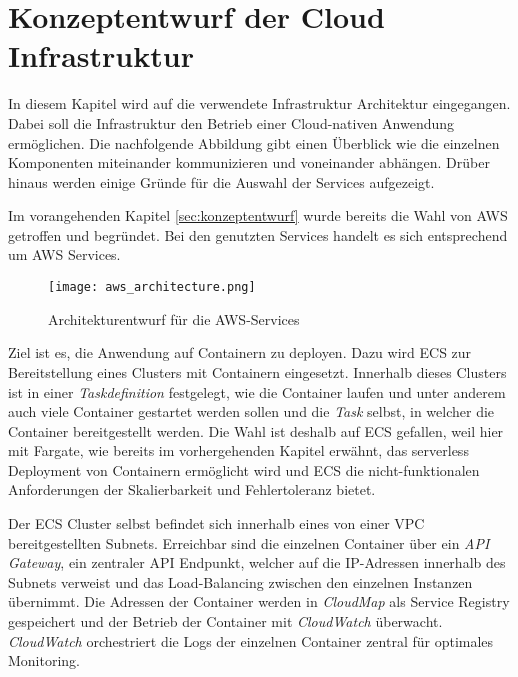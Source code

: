 \section{Konzeptentwurf der Cloud Infrastruktur}
\label{sec:cloud-infra}
In diesem Kapitel wird auf die verwendete Infrastruktur Architektur eingegangen. %
Dabei soll die Infrastruktur den Betrieb einer Cloud-nativen Anwendung ermöglichen. Die nachfolgende Abbildung gibt einen Überblick wie die einzelnen Komponenten miteinander kommunizieren und voneinander abhängen. Drüber hinaus werden einige Gründe für die Auswahl der Services aufgezeigt.

Im vorangehenden Kapitel \ref{sec:konzeptentwurf} wurde bereits die Wahl von \ac{AWS} getroffen und begründet. Bei den genutzten Services handelt es sich entsprechend um \ac{AWS} Services.

\begin{figure}[H]
    \centering
    \texttt{[image: aws\_architecture.png]}
    \caption{Architekturentwurf für die AWS-Services}
    \label{fig:CloudArchitektur}
\end{figure}

Ziel ist es, die Anwendung auf Containern zu deployen. Dazu wird \ac{ECS} zur Bereitstellung eines Clusters mit Containern eingesetzt. Innerhalb dieses Clusters ist in einer \textit{Taskdefinition} festgelegt, wie die Container laufen und unter anderem auch viele Container gestartet werden sollen und die \textit{Task} selbst, in welcher die Container bereitgestellt werden. Die Wahl ist deshalb auf \ac{ECS} gefallen, weil hier mit \gls{Fargate}, wie bereits im vorhergehenden Kapitel erwähnt, das serverless Deployment von Containern ermöglicht wird und \ac{ECS} die nicht-funktionalen Anforderungen der Skalierbarkeit und Fehlertoleranz bietet. \pagebreak

Der \ac{ECS} Cluster selbst befindet sich innerhalb eines von einer \ac{VPC} bereitgestellten Subnets. Erreichbar sind die einzelnen Container über ein \textit{API Gateway}, ein zentraler API Endpunkt, welcher auf die IP-Adressen innerhalb des Subnets verweist und das Load-Balancing zwischen den einzelnen Instanzen übernimmt. Die Adressen der Container werden in \textit{CloudMap} als Service Registry gespeichert und der Betrieb der Container mit \textit{CloudWatch} überwacht. \textit{CloudWatch} orchestriert die Logs der einzelnen Container zentral für optimales Monitoring.

